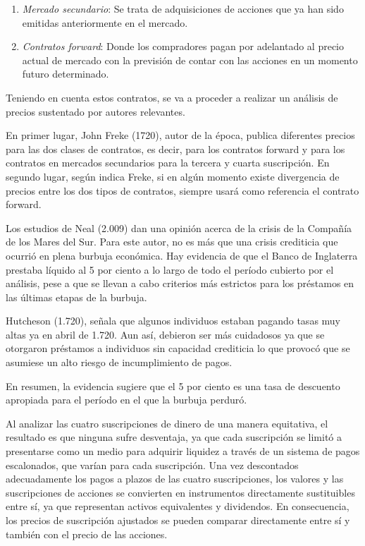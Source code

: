 \begin{enumerate}
	\item \emph{Mercado secundario}: Se trata de adquisiciones de acciones que ya han sido emitidas anteriormente en el mercado.
	\item \emph{Contratos forward}: Donde los compradores pagan por adelantado al precio actual de mercado con la previsión de contar con las acciones en un momento futuro determinado.
\end{enumerate}

Teniendo en cuenta estos contratos, se va a proceder a realizar un análisis de precios sustentado por autores relevantes.

En primer lugar, John Freke (1720), autor de la época, publica diferentes precios para las dos clases de contratos, es decir, para los contratos forward y para los contratos en mercados secundarios para la tercera y cuarta suscripción. 
En segundo lugar, según indica Freke, si en algún momento existe divergencia de precios entre los dos tipos de contratos, siempre usará como referencia el contrato forward.

Los estudios de Neal (2.009) dan una opinión acerca de la crisis de la Compañía de los Mares del Sur. Para este autor, no es más que una crisis crediticia que ocurrió en plena burbuja económica. Hay evidencia de que el Banco de Inglaterra prestaba líquido al 5 por ciento a lo largo de todo el período cubierto por el análisis, pese a que se llevan a cabo criterios más estrictos para los préstamos en las últimas etapas de la burbuja. 

Hutcheson (1.720), señala que algunos individuos estaban pagando tasas muy altas ya en abril de 1.720. Aun así, debieron ser más cuidadosos ya que se otorgaron préstamos a individuos sin capacidad crediticia lo que provocó que se asumiese un alto riesgo de incumplimiento de pagos. 

En resumen, la evidencia sugiere que el 5 por ciento es una tasa de descuento apropiada para el período en el que la burbuja perduró. 

Al analizar las cuatro suscripciones de dinero de una manera equitativa, el resultado es que ninguna sufre desventaja, ya que cada suscripción se limitó a presentarse como un medio para adquirir liquidez a través de un sistema de pagos escalonados, que varían para cada suscripción. Una vez descontados adecuadamente los pagos a plazos de las cuatro suscripciones, los valores y las suscripciones de acciones se convierten en instrumentos directamente sustituibles entre sí, ya que representan activos equivalentes y dividendos. En consecuencia, los precios de suscripción ajustados se pueden comparar directamente entre sí y también con el precio de las acciones. 

